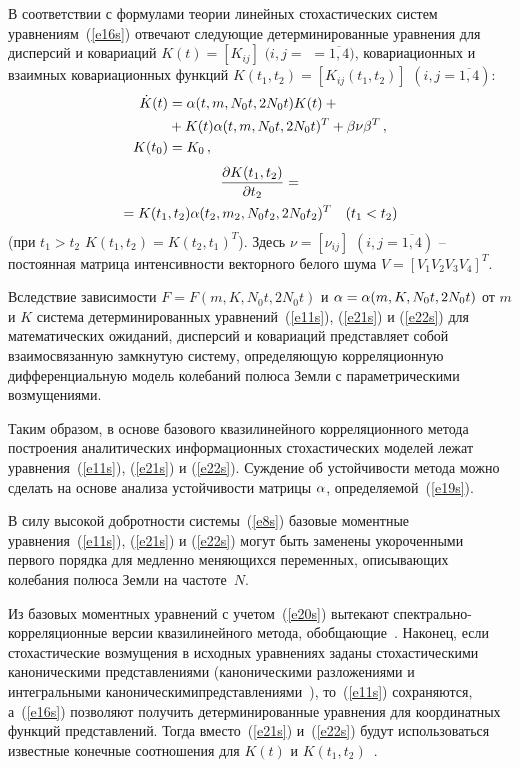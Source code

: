 \begin{multicols}{2}
В соответствии с формулами теории линейных стохастических систем~\cite{23s}
уравнениям~(\ref{e16s}) отвечают следующие детерминированные
уравнения для дисперсий и ковариаций $K(t) =[K_{ij}]$ $(i,j =$\linebreak
$={\overline{1,4}})$, ковариационных и взаимных ковариационных
функций $K(t_1, t_2)= [ K_{ij} (t_1, t_2)]$ $(i,j = {\overline{1,4}})$:
\begin{align}
\dot{K} (t) &= \alpha(t, m, N_0t, 2N_0t) K(t) + {}\notag\\
{}&+K(t) \alpha(t, m, N_0t, 2N_0t)^T + \beta\nu \beta^T\,,\notag\\
 K(t_0) &= K_0\,, \label{e21s}
 \end{align}
\begin{multline}
\displaystyle\frac{\displaystyle \partial K(t_1, t_2)\mathstrut}{\displaystyle \partial t_2\mathstrut} = \\
\!{}=K(t_1, t_2) \alpha( t_2, m_2, N_0t_2, 2N_0t_2)^T \quad (t_1 < t_2)
\label{e22s}
\end{multline}
(при $t_1 > t_2$ $K(t_1, t_2) = K (t_2, t_1)^T$). Здесь $\nu=
[ \nu_{ij}]$ $(i,j = {\overline{1,4}})$ -- постоянная матрица
интенсивности векторного белого шума $V=[ V_1 V_2 V_3 V_4]^T$.

Вследствие зависимости $F= F(m,K, N_0t, 2N_0t)$ и $\alpha
=\alpha(m,K,N_0t, 2N_0t)$ от $m$ и $K$ система детерминированных
уравнений~(\ref{e11s}), (\ref{e21s}) и (\ref{e22s}) для математических
ожиданий, дисперсий и ковариаций представляет собой взаимосвязанную замкнутую
систему, определяющую корреляционную дифференциальную модель колебаний
полюса Земли с параметрическими возмущениями.

Таким образом, в основе базового квазилинейного корреляционного
метода построения аналитических информационных стохастических
моделей лежат уравнения~(\ref{e11s}), (\ref{e21s}) и (\ref{e22s}). Суждение об устойчивости
метода можно сделать на основе анализа устойчивости матрицы
$\alpha$, определяемой~(\ref{e19s}).

В силу высокой добротности системы~(\ref{e8s}) базовые моментные
уравнения~(\ref{e11s}), (\ref{e21s}) и (\ref{e22s}) могут быть заменены
укороченными первого порядка для медленно меняющихся переменных, описывающих
колебания полюса Земли на частоте~$N$.

Из базовых моментных уравнений с учетом~(\ref{e20s}) вытекают
спект\-раль\-но-кор\-ре\-ля\-ци\-он\-ные версии квазилинейного метода,
обобщающие~\cite{12s, 19s}.\linebreak
 Наконец, если стохастические возмущения в
исходных уравнениях заданы стохастическими каноническими
представлениями (каноническими разложениями и интегральными
каноническими\linebreak представлениями~\cite{23s}), то~(\ref{e11s}) сохраняются, а~(\ref{e16s})
позволяют получить детерминированные уравнения для координатных
функций представлений. Тогда вместо~(\ref{e21s}) и~(\ref{e22s}) будут
использоваться известные конечные соотношения для $K(t)$ и
$K(t_1, t_2)$~\cite{23s}.


\end{multicols}
